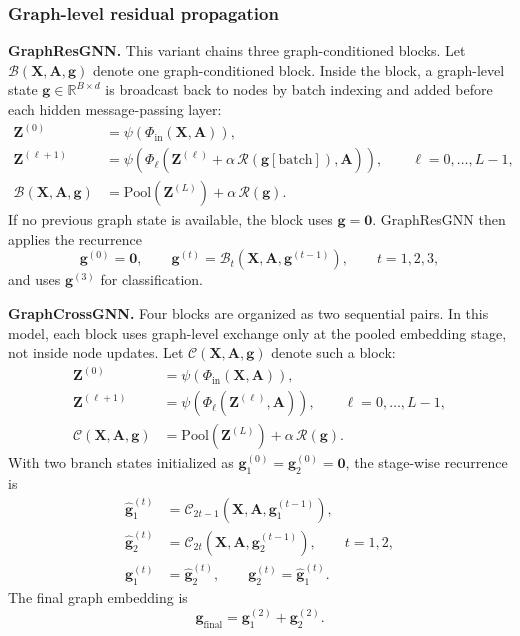 \subsubsection{Graph-level residual propagation}

\textbf{GraphResGNN.} This variant chains three graph-conditioned blocks. Let $\mathcal{B}(\mathbf{X},\mathbf{A},\mathbf{g})$ denote one graph-conditioned block. Inside the block, a graph-level state $\mathbf{g}\in\mathbb{R}^{B\times d}$ is broadcast back to nodes by batch indexing and added before each hidden message-passing layer:
\begin{align}
\mathbf{Z}^{(0)} &= \psi\!\left(\Phi_{\mathrm{in}}(\mathbf{X},\mathbf{A})\right), \\
\mathbf{Z}^{(\ell+1)} &=
\psi\!\left(
\Phi_{\ell}\!\left(
\mathbf{Z}^{(\ell)} + \alpha\,\mathcal{R}\!\left(\mathbf{g}[\mathrm{batch}]\right), \mathbf{A}
\right)
\right), \qquad \ell=0,\dots,L-1, \\
\mathcal{B}(\mathbf{X},\mathbf{A},\mathbf{g}) &=
\mathrm{Pool}\!\left(\mathbf{Z}^{(L)}\right) + \alpha\,\mathcal{R}(\mathbf{g}).
\end{align}
If no previous graph state is available, the block uses $\mathbf{g}=\mathbf{0}$. GraphResGNN then applies the recurrence
\begin{equation}
\mathbf{g}^{(0)}=\mathbf{0}, \qquad
\mathbf{g}^{(t)} = \mathcal{B}_{t}\!\left(\mathbf{X}, \mathbf{A}, \mathbf{g}^{(t-1)}\right), \qquad t=1,2,3,
\end{equation}
and uses $\mathbf{g}^{(3)}$ for classification.

\textbf{GraphCrossGNN.} Four blocks are organized as two sequential pairs. In this model, each block uses graph-level exchange only at the pooled embedding stage, not inside node updates. Let $\mathcal{C}(\mathbf{X},\mathbf{A},\mathbf{g})$ denote such a block:
\begin{align}
\mathbf{Z}^{(0)} &= \psi\!\left(\Phi_{\mathrm{in}}(\mathbf{X},\mathbf{A})\right), \\
\mathbf{Z}^{(\ell+1)} &= \psi\!\left(\Phi_{\ell}\!\left(\mathbf{Z}^{(\ell)},\mathbf{A}\right)\right), \qquad \ell=0,\dots,L-1, \\
\mathcal{C}(\mathbf{X},\mathbf{A},\mathbf{g}) &= \mathrm{Pool}\!\left(\mathbf{Z}^{(L)}\right) + \alpha\,\mathcal{R}(\mathbf{g}).
\end{align}
With two branch states initialized as $\mathbf{g}^{(0)}_{1}=\mathbf{g}^{(0)}_{2}=\mathbf{0}$, the stage-wise recurrence is
\begin{align}
\widehat{\mathbf{g}}^{(t)}_{1} &= \mathcal{C}_{2t-1}\!\left(\mathbf{X}, \mathbf{A}, \mathbf{g}^{(t-1)}_{1}\right), \\
\widehat{\mathbf{g}}^{(t)}_{2} &= \mathcal{C}_{2t}\!\left(\mathbf{X}, \mathbf{A}, \mathbf{g}^{(t-1)}_{2}\right), \qquad t=1,2, \\
\mathbf{g}^{(t)}_{1} &= \widehat{\mathbf{g}}^{(t)}_{2}, \qquad
\mathbf{g}^{(t)}_{2} = \widehat{\mathbf{g}}^{(t)}_{1}.
\end{align}
The final graph embedding is
\begin{equation}
\mathbf{g}_{\mathrm{final}} = \mathbf{g}^{(2)}_{1} + \mathbf{g}^{(2)}_{2}.
\end{equation}

